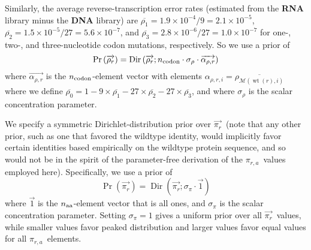 \documentclass[12pt,draft]{article}
\DeclareMathOperator{\dirichlet}{Dir}
\DeclareMathOperator{\wt}{wt}
\newcommand{\naa}{\mbox{$n_{\rm{aa}}$}}
\newcommand{\ncodon}{\mbox{$n_{\rm{codon}}$}}
\newcommand{\rrvec}{\mbox{$\overrightarrow{\rho_{r}}$}}
\newcommand{\pira}{\mbox{$\pi_{r,a}$}}
\newcommand{\pirvec}{\mbox{$\overrightarrow{\pi_r}$}}
\begin{document}
Similarly, the average reverse-transcription error rates (estimated from the {\bf RNA} library minus the {\bf DNA} library) are $\overline{\rho_1} = 1.9 \times 10^{-4} / 9 = 2.1\times 10^{-5}$, $\overline{\rho_2} = 1.5 \times 10^{-5} / 27 = 5.6\times 10^{-7}$, and $\overline{\rho_3} = 2.8 \times 10^{-6} / 27 = 1.0 \times 10^{-7}$ for one-, two-, and three-nucleotide codon mutations, respectively. So we use a prior of
\begin{equation}
\Pr\left(\rrvec\right) = \dirichlet\left(\rrvec; \ncodon \cdot \sigma_{\rho} \cdot \overrightarrow{\alpha_{\rho,r}}\right)
\end{equation}
where $\overrightarrow{\alpha_{\rho,r}}$ is the \ncodon-element vector with elements $\alpha_{\rho,r,i} = \overline{\rho_{\mathcal{M}\left(\wt\left(r\right),i\right)}}$ where we define $\overline{\rho_0} = 1 - 9 \times \overline{\rho_1} - 27 \times \overline{\rho_2} - 27 \times \overline{\rho_3}$, and where $\sigma_{\rho}$ is the scalar concentration parameter.

We specify a symmetric Dirichlet-distribution prior over \pirvec\ (note that any other prior, such as one that favored the wildtype identity, would implicitly favor certain identities based empirically on the wildtype protein sequence, and so would not be in the spirit of the parameter-free derivation of the \pira\ values employed here). Specifically, we use a prior of
\begin{equation}
\Pr\left(\pirvec\right) = \dirichlet\left(\pirvec; \sigma_{\pi} \cdot \overrightarrow{1} \right)
\end{equation}  
where $\overrightarrow{1}$ is the \naa-element vector that is all ones, and $\sigma_{\pi}$ is the scalar concentration parameter. Setting $\sigma_{\pi} = 1$ gives a uniform prior over all \pirvec\ values, while smaller values favor peaked distribution and larger values favor equal values for all \pira\ elements.
\end{document}

